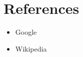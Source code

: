 \documentclass{article}
\begin{document}
	
	\section{References}
	\begin{itemize}
		\item Google
		\item Wikipedia
	\end{itemize}
\end{document}
